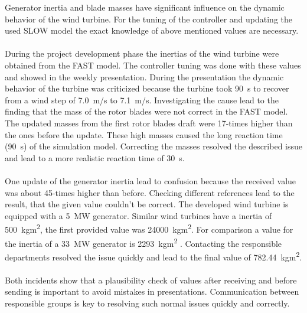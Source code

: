 Generator inertia and blade masses have significant influence on the dynamic behavior of the wind turbine.
For the tuning of the controller and updating the used \gls{SLOW} model the exact knowledge of above mentioned values are necessary.
\\
\\
During the project development phase the inertias of the wind turbine were obtained from the \gls{FAST} model. The controller tuning was done with these values and showed in the weekly presentation.
During the presentation the dynamic behavior of the  turbine was criticized because the turbine took \SI{90}{s} to recover from a wind step of \SI{7.0}{m/s} to \SI{7.1}{m/s}. 
Investigating the cause lead to the finding that the mass of the rotor blades were not correct in the \gls{FAST} model.
The updated masses from the first rotor blades draft were 17-times higher than the ones before the update.
These high masses caused the long reaction time (\SI{90}{s}) of the simulation model.
Correcting the masses resolved the described issue and lead to a more realistic reaction time of \SI{30}{s}.
\\
\\
One update of the generator inertia lead to confusion because the received value was about 45-times higher than before.
Checking different references lead to the result, that the given value couldn't be correct.
The developed wind turbine is equipped with a \SI{5}{MW} generator.
Similar wind turbines have a inertia of \SI{500}{kgm^2}, the first provided value was \SI{24000}{kgm^2}. For comparison a value for the inertia of a \SI{33}{MW} generator is \SI{2293}{kgm^2} \cite{InertiaJauchPaper}.
Contacting the responsible departments resolved the issue quickly and lead to the final value of \SI{782.44}{kgm^2}.
\\
\\
Both incidents show that a plausibility check of values after receiving and before sending is important to avoid mistakes in presentations.
Communication between responsible groups is key to resolving such normal issues quickly and correctly.
